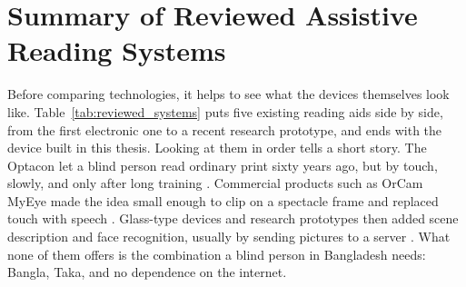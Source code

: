 \section{Summary of Reviewed Assistive Reading Systems}
\label{sec:reviewed_systems}

Before comparing technologies, it helps to see what the devices themselves look like. Table~\ref{tab:reviewed_systems} puts five existing reading aids side by side, from the first electronic one to a recent research prototype, and ends with the device built in this thesis. Looking at them in order tells a short story. The Optacon let a blind person read ordinary print sixty years ago, but by touch, slowly, and only after long training \cite{linvill1966}. Commercial products such as OrCam MyEye made the idea small enough to clip on a spectacle frame and replaced touch with speech \cite{orcam}. Glass-type devices and research prototypes then added scene description and face recognition, usually by sending pictures to a server \cite{googleglass2021, airis2024}. What none of them offers is the combination a blind person in Bangladesh needs: Bangla, Taka, and no dependence on the internet.

